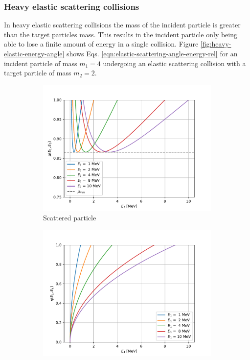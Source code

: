 \subsubsection{Heavy elastic scattering collisions}
In heavy elastic scattering collisions the mass of the incident particle is greater than the target particles mass. This results in the incident particle only being able to lose a finite amount of energy in a single collision. Figure \ref{fig:heavy-elastic-energy-angle} shows Eqs. \eqref{eqn:elastic-scattering-angle-energy-rel} for an incident particle of mass $m_1 = 4$ undergoing an elastic scattering collision with a target particle of mass $m_2 = 2$. 
\begin{figure}[!htb]
  \centering
  \begin{subfigure}{.5\textwidth}
    \centering
    \includegraphics[width=\linewidth]{../figures/particle_kinematics/heavy_energy_angle.pdf}
    \caption{Scattered particle}
    \label{fig:heavy-elastic-energy-angle-scattered}
  \end{subfigure}%
  \begin{subfigure}{.5\textwidth}
    \centering
    \includegraphics[width=\linewidth]{../figures/particle_kinematics/heavy_recoil_energy_angle.pdf}

\end{subfigure}
\end{figure}

